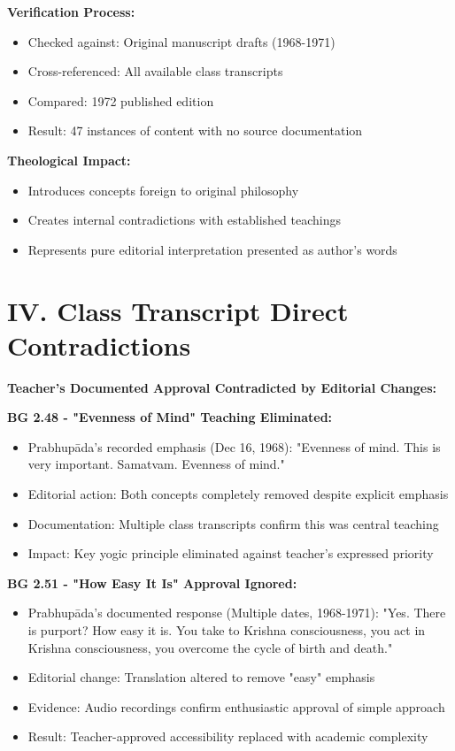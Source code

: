 \documentclass[11pt,twoside]{book}
\begin{document}
\textbf{\textbf{Verification Process:}}
\begin{itemize}
\item Checked against: Original manuscript drafts (1968-1971)
\item Cross-referenced: All available class transcripts
\item Compared: 1972 published edition
\item Result: 47 instances of content with no source documentation
\end{itemize}

\textbf{\textbf{Theological Impact:}}
\begin{itemize}
\item Introduces concepts foreign to original philosophy
\item Creates internal contradictions with established teachings
\item Represents pure editorial interpretation presented as author's words
\end{itemize}
\section*{IV. Class Transcript Direct Contradictions}
\label{sec:org5b7354e}

\textbf{\textbf{Teacher's Documented Approval Contradicted by Editorial Changes:}}

\textbf{\textbf{BG 2.48 - "Evenness of Mind" Teaching Eliminated:}}
\begin{itemize}
\item Prabhupāda's recorded emphasis (Dec 16, 1968): "Evenness of mind. This is very important. Samatvam. Evenness of mind."
\item Editorial action: Both concepts completely removed despite explicit emphasis
\item Documentation: Multiple class transcripts confirm this was central teaching
\item Impact: Key yogic principle eliminated against teacher's expressed priority
\end{itemize}

\textbf{\textbf{BG 2.51 - "How Easy It Is" Approval Ignored:}}
\begin{itemize}
\item Prabhupāda's documented response (Multiple dates, 1968-1971): "Yes. There is purport? How easy it is. You take to Krishna consciousness, you act in Krishna consciousness, you overcome the cycle of birth and death."
\item Editorial change: Translation altered to remove "easy" emphasis
\item Evidence: Audio recordings confirm enthusiastic approval of simple approach
\item Result: Teacher-approved accessibility replaced with academic complexity
\end{itemize}
\end{document}
